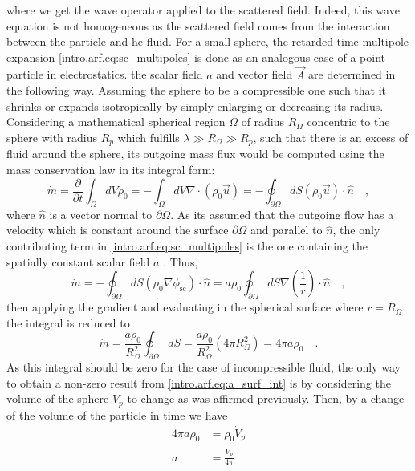 where we get the wave operator applied to the scattered field. Indeed, this wave equation is not homogeneous as the scattered field comes from the interaction between the particle and he fluid. For a small sphere, the retarded time multipole expansion \eqref{intro.arf.eq:sc_multipoles} is done as an analogous case of a point particle in electrostatics. the scalar field $a$ and vector field $\vec A$ are determined in the following way. Assuming the sphere to be a compressible one such that it shrinks or expands isotropically by simply enlarging or decreasing its radius. Considering a mathematical spherical region $\Omega$ of radius $R_{\Omega}$ concentric to the sphere with radius $R_p$ which fulfills $\lambda\gg R_{\Omega}\gg R_p$, such that there is an excess of fluid around the sphere, its outgoing mass flux would be computed using the mass conservation law in its integral form: 
\begin{equation}
    \dot m = \frac{\partial}{\partial t}\int_{\Omega}dV \rho_0 = -\int_\Omega dV \nabla\cdot(\rho_0\vec u) = -\oint_{\partial\Omega} dS (\rho_0\vec u)\cdot\hat n\quad,
\end{equation}
where $\hat n$ is a vector normal to $\partial\Omega$. As its assumed that the outgoing flow has a velocity which is constant around the surface $\partial\Omega$ and parallel to $\hat n$, the only contributing term in \eqref{intro.arf.eq:sc_multipoles} is the one containing the spatially constant scalar field $a$ \cite[~p.282]{Landau}\cite[~p.70]{Manneberg2009}. Thus,
\begin{equation}
    \dot m = -\oint_{\partial\Omega} dS (\rho_0\nabla\phi_{\text{sc}})\cdot\hat n = a\rho_0\oint_{\partial\Omega} dS \nabla\left(\frac{1}{r}\right)\cdot\hat n\quad,
\end{equation}
then applying the gradient and evaluating in the spherical surface where $r=R_\Omega$ the integral is reduced to
\begin{equation}\label{intro.arf.eq:a_surf_int}
    \dot m = \frac{a\rho_0}{R_\Omega^2}\oint_{\partial\Omega} dS = \frac{a\rho_0}{R_\Omega^2} (4\pi R_\Omega^2) = 4\pi a\rho_0\quad.
\end{equation}
As this integral should be zero for the case of incompressible fluid, the only way to obtain a non-zero result from \eqref{intro.arf.eq:a_surf_int} is by considering the volume of the sphere $V_p$ to change as was affirmed previously. Then, by a change of the volume of the particle in time we have
\begin{align}
    4\pi a\rho_0 &= \rho_0\dot V_p \nonumber\\
    a &= \frac{\dot V_p}{4\pi}
\end{align}
